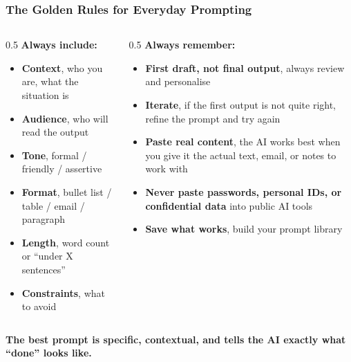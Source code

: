 \begin{frame}[fragile]\frametitle{The Golden Rules for Everyday Prompting}

\begin{columns}
    \begin{column}[T]{0.5\linewidth}
    \textbf{Always include:}
    \begin{itemize}
        \item \textbf{Context}, who you are, what the situation is
        \item \textbf{Audience}, who will read the output
        \item \textbf{Tone}, formal / friendly / assertive
        \item \textbf{Format}, bullet list / table / email / paragraph
        \item \textbf{Length}, word count or ``under X sentences''
        \item \textbf{Constraints}, what to avoid
    \end{itemize}
    \end{column}
    \begin{column}[T]{0.5\linewidth}
    \textbf{Always remember:}
    \begin{itemize}
        \item \textbf{First draft, not final output}, always review and personalise
        \item \textbf{Iterate}, if the first output is not quite right, refine the prompt and try again
        \item \textbf{Paste real content}, the AI works best when you give it the actual text, email, or notes to work with
        \item \textbf{Never paste passwords, personal IDs, or confidential data} into public AI tools
        \item \textbf{Save what works}, build your prompt library
    \end{itemize}
    \end{column}
\end{columns}

\medskip
\begin{center}
\textbf{The best prompt is specific, contextual, and tells the AI exactly what ``done'' looks like.}
\end{center}

\end{frame}

